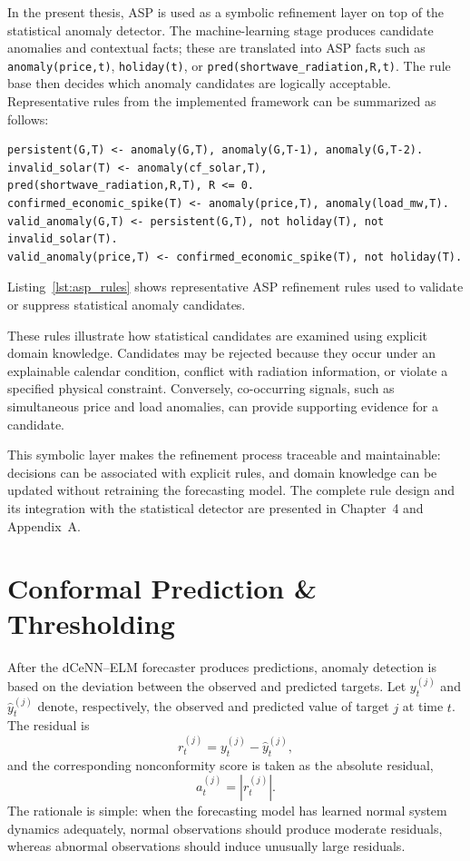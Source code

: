 In the present thesis, ASP is used as a symbolic refinement layer on top of the statistical anomaly detector. The machine-learning stage produces candidate anomalies and contextual facts; these are translated into ASP facts such as \texttt{anomaly(price,t)}, \texttt{holiday(t)}, or \texttt{pred(shortwave\_radiation,R,t)}. The rule base then decides which anomaly candidates are logically acceptable. Representative rules from the implemented framework can be summarized as follows:
\begin{lstlisting}[style=asprules,caption={Representative ASP refinement rules.},label={lst:asp_rules}]
persistent(G,T) <- anomaly(G,T), anomaly(G,T-1), anomaly(G,T-2).
invalid_solar(T) <- anomaly(cf_solar,T), pred(shortwave_radiation,R,T), R <= 0.
confirmed_economic_spike(T) <- anomaly(price,T), anomaly(load_mw,T).
valid_anomaly(G,T) <- persistent(G,T), not holiday(T), not invalid_solar(T).
valid_anomaly(price,T) <- confirmed_economic_spike(T), not holiday(T).
\end{lstlisting}
Listing~\ref{lst:asp_rules} shows representative ASP refinement rules used to validate or suppress statistical anomaly candidates.

These rules illustrate how statistical candidates are examined using explicit
domain knowledge. Candidates may be rejected because they occur under an
explainable calendar condition, conflict with radiation information, or violate a
specified physical constraint. Conversely, co-occurring signals, such as
simultaneous price and load anomalies, can provide supporting evidence for a
candidate.

This symbolic layer makes the refinement process traceable and maintainable:
decisions can be associated with explicit rules, and domain knowledge can be
updated without retraining the forecasting model. The complete rule design and
its integration with the statistical detector are presented in Chapter~4 and
Appendix~A.

\section{Conformal Prediction \& Thresholding}

After the dCeNN--ELM forecaster produces predictions, anomaly detection is based on the deviation between the observed and predicted targets. Let $y_t^{(j)}$ and $\hat{y}_t^{(j)}$ denote, respectively, the observed and predicted value of target $j$ at time $t$. The residual is
\begin{equation}
r_t^{(j)} = y_t^{(j)} - \hat{y}_t^{(j)},
\label{eq:residual_def}
\end{equation}
and the corresponding nonconformity score is taken as the absolute residual,
\begin{equation}
a_t^{(j)} = \left|r_t^{(j)}\right|.
\label{eq:nonconformity_abs}
\end{equation}
The rationale is simple: when the forecasting model has learned normal system dynamics adequately, normal observations should produce moderate residuals, whereas abnormal observations should induce unusually large residuals.

